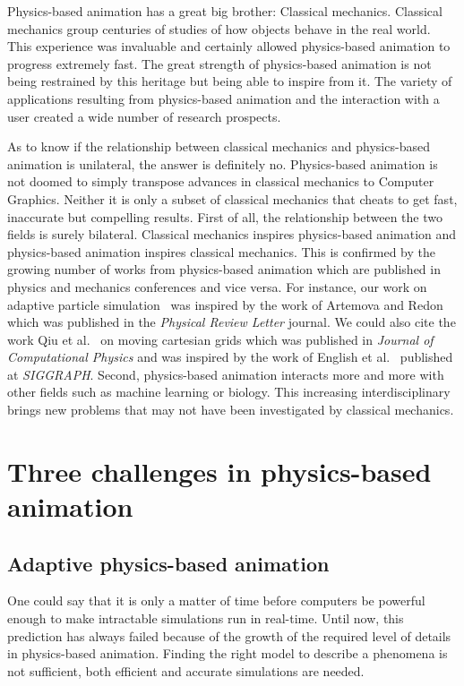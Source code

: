 Physics-based animation has a great big brother: Classical mechanics. Classical mechanics group centuries of studies of how objects behave in the real world. This experience was invaluable and certainly allowed physics-based animation to progress extremely fast. The great strength of physics-based animation is not being restrained by this heritage but being able to inspire from it. The variety of applications resulting from physics-based animation and the interaction with a user created a wide number of research prospects. 

As to know if the relationship between classical mechanics and physics-based animation is unilateral, the answer is definitely no. Physics-based animation is not doomed to simply transpose advances in classical mechanics to Computer Graphics. Neither it is only a subset of classical mechanics that cheats to get fast, inaccurate but compelling results. 
First of all, the relationship between the two fields is surely bilateral. Classical mechanics inspires physics-based animation and physics-based animation inspires classical mechanics. 
This is confirmed by the growing number of works from physics-based animation which are published in physics and mechanics conferences and vice versa.
For instance, our work on adaptive particle simulation~\cite{Manteaux2013} was inspired by the work of Artemova and Redon~\cite{Artemova2012} which was published in the \emph{Physical Review Letter} journal.
We could also cite the work Qiu et al.~\cite{Qiu2016} on moving cartesian grids which was published in \emph{Journal of Computational Physics} and was inspired by the work of English et al.~\cite{English2013} published at \emph{SIGGRAPH}.
Second, physics-based animation interacts more and more with other fields such as machine learning or biology. This increasing interdisciplinary brings new problems that may not have been investigated by classical mechanics. 

\section{Three challenges in physics-based animation}

\subsection{Adaptive physics-based animation}
One could say that it is only a matter of time before computers be powerful enough to make intractable simulations run in real-time. Until now, this prediction has always failed because of the growth of the required level of details in physics-based animation. Finding the right model to describe a phenomena is not sufficient, both efficient and accurate simulations are needed.

